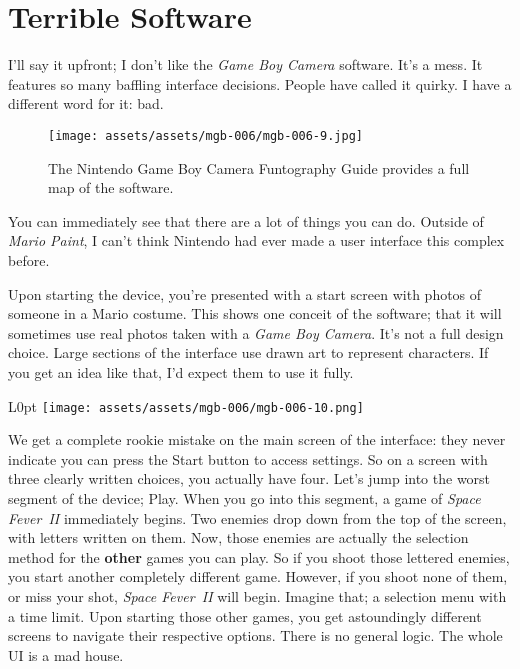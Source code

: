 \documentclass{book}
\begin{document}
\FloatBarrier\needspace{10mm}\section*{Terrible Software}\nopagebreak[4]

I’ll say it upfront; I don’t like the \emph{Game Boy Camera} software. It’s a mess. It features so many baffling interface decisions. People have called it quirky. I have a different word for it: bad.

\begin{figure}[hbt]
\vskip 10pt
\centering \texttt{[image: assets/assets/mgb-006/mgb-006-9.jpg]}\par\pagetwodescription The Nintendo Game Boy Camera Funtography Guide provides a full map of the software.
\vskip 6pt
\end{figure}

You can immediately see that there are a lot of things you can do. Outside of \emph{Mario Paint}, I can’t think Nintendo had ever made a user interface this complex before.

Upon starting the device, you’re presented with a start screen with photos of someone in a Mario costume. This shows one conceit of the software; that it will sometimes use real photos taken with a \emph{Game Boy Camera}. It’s not a full design choice. Large sections of the interface use drawn art to represent characters. If you get an idea like that, I’d expect them to use it fully.

\begin{wrapfigure}{L}{0pt} \texttt{[image: assets/assets/mgb-006/mgb-006-10.png]}\end{wrapfigure}

We get a complete rookie mistake on the main screen of the interface: they never indicate you can press the Start button to access settings. So on a screen with three clearly written choices, you actually have four. Let’s jump into the worst segment of the device; Play. When you go into this segment, a game of \emph{Space Fever II} immediately begins. Two enemies drop down from the top of the screen, with letters written on them. Now, those enemies are actually the selection method for the \textbf{other} games you can play. So if you shoot those lettered enemies, you start another completely different game. However, if you shoot none of them, or miss your shot, \emph{Space Fever II} will begin. Imagine that; a selection menu with a time limit. Upon starting those other games, you get astoundingly different screens to navigate their respective options. There is no general logic. The whole UI is a mad house.
\end{document}
